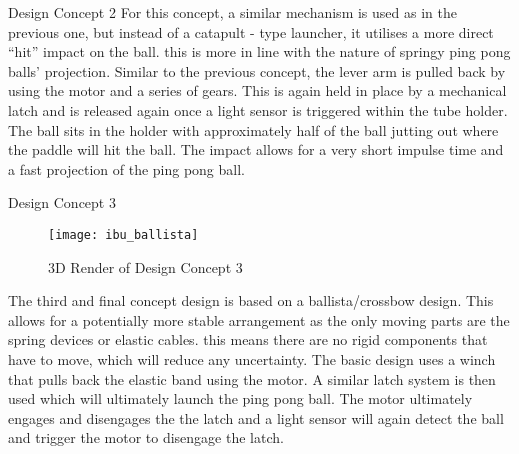 \begin{homeworkProblem}
\begin{homeworkSection}{Design Concept 2}
For this concept, a similar mechanism is used as in the previous one, but instead of a catapult - type launcher, it utilises a more direct “hit” impact on the ball. this is more in line with the nature of springy ping pong balls' projection. Similar to the previous concept, the lever arm is pulled back by using the motor and a series of gears. This is again held in place by a mechanical latch and is released again once a light sensor is triggered within the tube holder. The ball sits in the holder with approximately half of the ball jutting out where the paddle will hit the ball. The impact allows for a very short impulse time and a fast projection of the ping pong ball.

\end{homeworkSection}

\begin{homeworkSection}{Design Concept 3}
  \begin{figure}[H]
    \begin{center}
      \texttt{[image: ibu\_ballista]}
      \caption{3D Render of Design Concept 3}
      \label{concept3}
    \end{center}
  \end{figure}

  The third and final concept design is based on a ballista/crossbow design. This allows for a potentially more stable arrangement as the only moving parts are the spring devices or elastic cables. this means there are no rigid components that have to move, which will reduce any uncertainty. The basic design uses a winch that pulls back the elastic band using the motor. A similar latch system is then used which will ultimately launch the ping pong ball. The motor ultimately engages and disengages the the latch and a light sensor will again detect the ball and trigger the motor to disengage the latch.

\end{homeworkSection}
\end{homeworkProblem}

\clearpage

